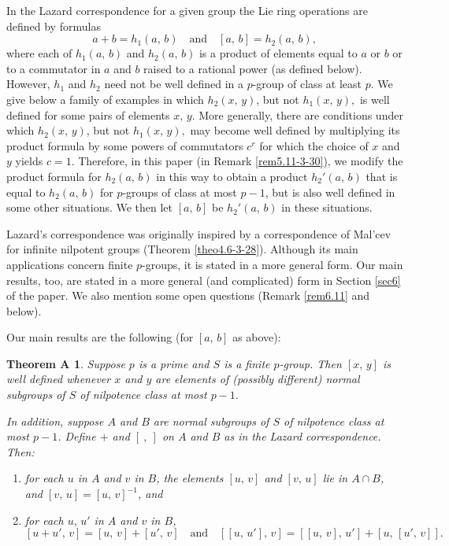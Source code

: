 \documentclass[mathscr]{amsart}
\theoremstyle{theorem}
\newtheorem*{theoA}{Theorem A}
\theoremstyle{definition}
\numberwithin{equation}{section}
\def\[{\left[}
\def\]{\right]}
\begin{document}
In the Lazard correspondence for a given group the Lie ring
operations are defined by formulas
$$a+b=h_1(a,\,b)\quad\text{and}\quad[a,\,b]=h_2(a,\,b),$$
where each of $h_1(a,\,b)$ and $h_2(a,\,b)$ is a product of elements
equal to $a$ or $b$ or to a commutator in $a$ and $b$ raised to a
rational power (as defined below). However, $h_1$ and $h_2$ need not
be well defined in a $p$-group of class at least $p$. We give below
a family of examples in which $h_2(x,\,y)$, but not $h_1(x,\,y),$ is
well defined  for some pairs of elements $x,\,y$. More generally,
there are conditions under which $h_2(x,\,y)$, but not $h_1(x,\,y),$
may become well defined by multiplying its product formula by some
powers of commutators $c^r$ for which  the choice of $x$ and $y$
yields $c=1$. Therefore, in this paper (in Remark
\ref{rem5.11-3-30}), we modify the product formula for $h_2(a,\,b)$
in this way to obtain a product $h_2'(a,\,b)$ that is equal to
$h_2(a,\,b)$ for $p$-groups of class at most $p-1$, but is also well
defined in some other situations. We then let $[a,\,b]$ be
$h_2'(a,\,b)$ in these situations.

Lazard's correspondence was originally inspired by a correspondence
of Mal'cev for infinite nilpotent groups (Theorem
\ref{theo4.6-3-28}). Although its main applications concern finite
$p$-groups, it is stated in a more general form. Our main results,
too, are stated in a more general (and complicated) form in Section
\ref{sec6} of the paper. We also mention some open questions (Remark
\ref{rem6.11} and below).

Our main results are the following (for $[a,\,b]$ as above):

\begin{theoA}
Suppose $p$ is a prime and $S$ is a finite $p$-group. Then $[x,\,y]$
is well defined whenever $x$ and $y$ are elements of (possibly
different) normal subgroups of $S$ of nilpotence class at most
$p-1.$

In addition, suppose $A$ and $B$ are normal subgroups of $S$ of
nilpotence class at most $p-1$. Define $+$ and $[\ ,\ ]$ on $A$ and
$B$ as in the Lazard correspondence. Then:
\begin{enumerate}
\item[(i)] for each $u$ in $A$ and $v$ in $B$, the elements $[u,\,v]$ and $[v,\,u]$ lie in $A\cap B$,
and $[v,\,u]=[u,\,v]^{-1}$, and
\item[(ii)] for each $u,\,u'$ in $A$ and $v$ in $B$,
$$[u+u',\,v]=[u,\,v]+[u',\,v]\quad\text{and}\quad\[\[u,\,u'\],\,v\]=\[\[u,\,v\],\,u'\]+\[u,\,\[u',\,v\]\].$$
\end{enumerate}
\end{theoA}
\end{document}
